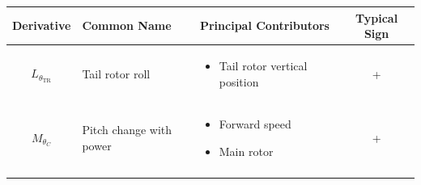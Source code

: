 \documentclass[
]{book}
\providecommand{\tightlist}{%
  \setlength{\itemsep}{0pt}\setlength{\parskip}{0pt}}
\begin{document}
\begin{longtable}[]{@{}cllc@{}}
\toprule
\begin{minipage}[b]{0.26\columnwidth}\centering
\textbf{Derivative}\strut
\end{minipage} & \begin{minipage}[b]{0.16\columnwidth}\raggedright
\textbf{Common Name}\strut
\end{minipage} & \begin{minipage}[b]{0.30\columnwidth}\raggedright
\textbf{Principal Contributors}\strut
\end{minipage} & \begin{minipage}[b]{0.17\columnwidth}\centering
\textbf{Typical Sign}\strut
\end{minipage}\tabularnewline
\midrule
\endhead
\begin{minipage}[t]{0.26\columnwidth}\centering
\(L_{\theta_{\text{TR}}}\)\strut
\end{minipage} & \begin{minipage}[t]{0.16\columnwidth}\raggedright
Tail rotor roll\strut
\end{minipage} & \begin{minipage}[t]{0.30\columnwidth}\raggedright
\begin{itemize}
\tightlist
\item
  Tail rotor vertical position
\end{itemize}\strut
\end{minipage} & \begin{minipage}[t]{0.17\columnwidth}\centering
+\strut
\end{minipage}\tabularnewline
\begin{minipage}[t]{0.26\columnwidth}\centering
\(M_{\theta_C}\)\strut
\end{minipage} & \begin{minipage}[t]{0.16\columnwidth}\raggedright
Pitch change
with power\strut
\end{minipage} & \begin{minipage}[t]{0.30\columnwidth}\raggedright
\begin{itemize}
\tightlist
\item
  Forward speed
\item
  Main rotor
\end{itemize}\strut
\end{minipage} & \begin{minipage}[t]{0.17\columnwidth}\centering
+\strut
\end{minipage}\tabularnewline
\begin{minipage}[t]{0.26\columnwidth}\centering

\end{minipage}
\end{longtable}
\end{document}
